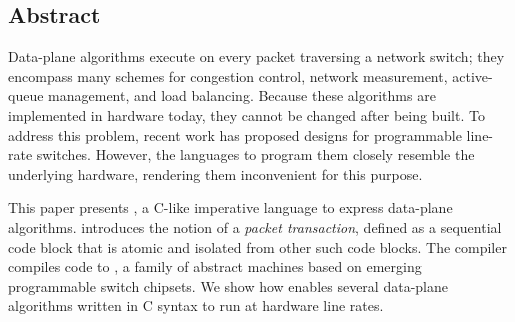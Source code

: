 \subsection*{Abstract}
Data-plane algorithms execute on every packet traversing a network switch; they
encompass many schemes for congestion control, network measurement,
active-queue management, and load balancing. Because these algorithms are
implemented in hardware today, they cannot be changed after being built. To
address this problem, recent work has proposed designs for programmable
line-rate switches.  However, the languages to program them closely resemble
the underlying hardware, rendering them inconvenient for this purpose.

This paper presents \pktlanguage, a C-like imperative language to express
data-plane algorithms. \pktlanguage introduces the notion of a {\em packet
transaction}, defined as a sequential code block that is atomic and isolated
from other such code blocks.  The \pktlanguage compiler compiles \pktlanguage
code to \absmachine, a family of abstract machines based on emerging
programmable switch chipsets. We show how \pktlanguage enables several
data-plane algorithms written in C syntax to run at hardware line rates.

